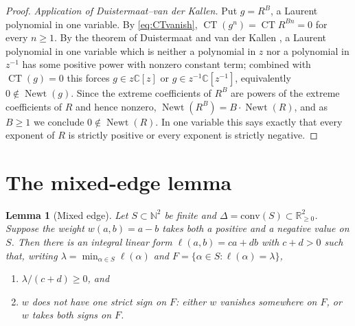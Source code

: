 \documentclass[11pt]{amsart}
\theoremstyle{plain}
\newtheorem{lemma}[theorem]{Lemma}
\theoremstyle{remark}
\numberwithin{equation}{section}
\DeclareMathOperator{\CT}{CT}
\DeclareMathOperator{\Newt}{Newt}
\newcommand{\C}{\mathbb{C}}
\newcommand{\N}{\mathbb{N}}
\begin{document}
\begin{proof}
\smallskip
\noindent\emph{Application of Duistermaat--van der Kallen.} Put $g=R^{B}$, a
Laurent polynomial in one variable. By \eqref{eq:CTvanish},
$\CT(g^{n})=\CT R^{Bn}=0$ for every $n\ge1$. By the theorem of Duistermaat and
van der Kallen \cite{DvdK}, a Laurent polynomial in one variable which is
neither a polynomial in $z$ nor a polynomial in $z^{-1}$ has some positive power
with nonzero constant term; combined with $\CT(g)=0$ this forces
$g\in z\C[z]$ or $g\in z^{-1}\C[z^{-1}]$, equivalently $0\notin\Newt(g)$. Since
the extreme coefficients of $R^{B}$ are powers of the extreme coefficients of
$R$ and hence nonzero, $\Newt(R^{B})=B\cdot\Newt(R)$, and as $B\ge1$ we conclude
$0\notin\Newt(R)$. In one variable this says exactly that every exponent of $R$
is strictly positive or every exponent is strictly negative.
\end{proof}

\section{The mixed-edge lemma}\label{sec:edge}

\begin{lemma}[Mixed edge]\label{lem:edge}
Let $S\subset\N^2$ be finite and $\Delta=\mathrm{conv}(S)\subset\mathbb
R_{\ge0}^2$. Suppose the weight $w(a,b)=a-b$ takes both a positive and a
negative value on $S$. Then there is an integral linear form
$\ell(a,b)=ca+db$ with $c+d>0$ such that, writing
$\lambda=\min_{\alpha\in S}\ell(\alpha)$ and $F=\{\alpha\in S:\ell(\alpha)=\lambda\}$,
\begin{enumerate}
\item[(i)] $\lambda/(c+d)\ge0$, and
\item[(ii)] $w$ does not have one strict sign on $F$: either $w$ vanishes
somewhere on $F$, or $w$ takes both signs on $F$.
\end{enumerate}
\end{lemma}
\end{document}
